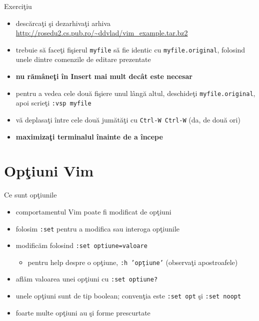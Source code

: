 \documentclass{beamer}
\begin{document}
\begin{frame}{Exerciţiu}
\begin{itemize}
  \item descărcaţi şi dezarhivaţi arhiva
  \url{http://rosedu2.cs.pub.ro/~ddvlad/vim\_example.tar.bz2}
  \item trebuie să faceţi fişierul \texttt{myfile} să fie identic cu
  \texttt{myfile.original}, folosind unele dintre comenzile de editare
  prezentate
  \item \textbf{nu rămâneţi în Insert mai mult decât este necesar}
  \item pentru a vedea cele două fişiere unul lângă altul, deschideţi
  \texttt{myfile.original}, apoi scrieţi \texttt{:vsp myfile}
  \item vă deplasaţi între cele două jumătăţi cu \texttt{Ctrl-W Ctrl-W} (da,
  de două ori)
  \item \textbf{maximizaţi terminalul înainte de a începe}
\end{itemize}
\end{frame}

\section{Opţiuni Vim}
\frame{\tableofcontents[currentsection]}

\begin{frame}{Ce sunt opţiunile}
\begin{itemize}
  \item<1-> comportamentul Vim poate fi modificat de opţiuni
  \item<2-> folosim \texttt{:set} pentru a modifica sau interoga opţiunile
  \item<3-> modificăm folosind \texttt{:set optiune=valoare}
    \begin{itemize}
    \item<4-> pentru help despre o opţiune, \texttt{:h 'opţiune'} (observaţi
    apostroafele)
    \end{itemize}
  \item<5-> aflăm valoarea unei opţiuni cu \texttt{:set optiune?}
  \item<6-> unele opţiuni sunt de tip boolean; convenţia este \texttt{:set opt}
  şi \texttt{:set noopt}
  \item<7-> foarte multe opţiuni au şi forme prescurtate
\end{itemize}
\end{frame}
\end{document}
